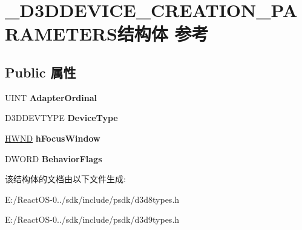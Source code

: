 \hypertarget{struct___d3_d_d_e_v_i_c_e___c_r_e_a_t_i_o_n___p_a_r_a_m_e_t_e_r_s}{}\section{\+\_\+\+D3\+D\+D\+E\+V\+I\+C\+E\+\_\+\+C\+R\+E\+A\+T\+I\+O\+N\+\_\+\+P\+A\+R\+A\+M\+E\+T\+E\+R\+S结构体 参考}
\label{struct___d3_d_d_e_v_i_c_e___c_r_e_a_t_i_o_n___p_a_r_a_m_e_t_e_r_s}
\subsection*{Public 属性}
\begin{DoxyCompactItemize}
\item 
\mbox{\label{struct___d3_d_d_e_v_i_c_e___c_r_e_a_t_i_o_n___p_a_r_a_m_e_t_e_r_s_a8359d70eace34133c1a8d054a1c44073}} 
U\+I\+NT {\bfseries Adapter\+Ordinal}
\item 
\mbox{\label{struct___d3_d_d_e_v_i_c_e___c_r_e_a_t_i_o_n___p_a_r_a_m_e_t_e_r_s_a0ec14e0922b5a730aafd31b24cf64e82}} 
D3\+D\+D\+E\+V\+T\+Y\+PE {\bfseries Device\+Type}
\item 
\mbox{\label{struct___d3_d_d_e_v_i_c_e___c_r_e_a_t_i_o_n___p_a_r_a_m_e_t_e_r_s_acca30de3c06e4ed41c0113272a93fc8a}} 
\hyperlink{interfacevoid}{H\+W\+ND} {\bfseries h\+Focus\+Window}
\item 
\mbox{\label{struct___d3_d_d_e_v_i_c_e___c_r_e_a_t_i_o_n___p_a_r_a_m_e_t_e_r_s_a53a707c87615b874db25378dd690eeed}} 
D\+W\+O\+RD {\bfseries Behavior\+Flags}
\end{DoxyCompactItemize}


该结构体的文档由以下文件生成\+:\begin{DoxyCompactItemize}
\item 
E\+:/\+React\+O\+S-\/0../sdk/include/psdk/d3d8types.\+h\item 
E\+:/\+React\+O\+S-\/0../sdk/include/psdk/d3d9types.\+h\end{DoxyCompactItemize}
